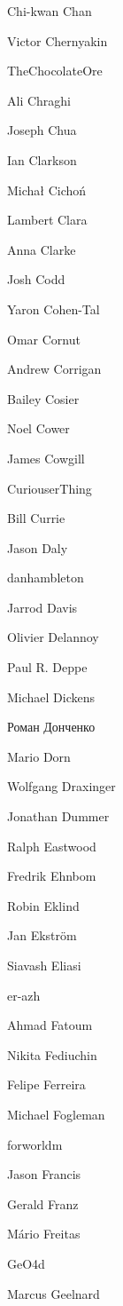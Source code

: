 \begin{DoxyItemize}
\item Chi-\/kwan Chan
\item Victor Chernyakin
\item The\+Chocolate\+Ore
\item Ali Chraghi
\item Joseph Chua
\item Ian Clarkson
\item Michał Cichoń
\item Lambert Clara
\item Anna Clarke
\item Josh Codd
\item Yaron Cohen-\/\+Tal
\item Omar Cornut
\item Andrew Corrigan
\item Bailey Cosier
\item Noel Cower
\item James Cowgill
\item Curiouser\+Thing
\item Bill Currie
\item Jason Daly
\item danhambleton
\item Jarrod Davis
\item Olivier Delannoy
\item Paul R. Deppe
\item Michael Dickens
\item Роман Донченко
\item Mario Dorn
\item Wolfgang Draxinger
\item Jonathan Dummer
\item Ralph Eastwood
\item Fredrik Ehnbom
\item Robin Eklind
\item Jan Ekström
\item Siavash Eliasi
\item er-\/azh
\item Ahmad Fatoum
\item Nikita Fediuchin
\item Felipe Ferreira
\item Michael Fogleman
\item forworldm
\item Jason Francis
\item Gerald Franz
\item Mário Freitas
\item Ge\+O4d
\item Marcus Geelnard

\end{DoxyItemize}
